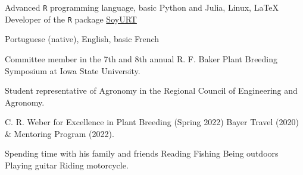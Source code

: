 \documentclass[]{mdkrause_cv_openfont}
\begin{document}
\begin{minipage}[t]{1\textwidth}
\sectionsep

Advanced \texttt{R} programming language, basic Python and Julia, Linux, \LaTeX \hspace{1 mm} \textbullet{} Developer of the \texttt{R} package \href{https://cran.r-project.org/web/packages/SoyURT/index.html}{SoyURT} \ExternalLink

\sectionsep

Portuguese (native), English, basic French

\sectionsep

\begin{tightemize}
	\item {} Committee member in the 7th and 8th annual R. F. Baker Plant Breeding Symposium at Iowa State University.
	\item {} Student representative of Agronomy in the Regional Council of Engineering and Agronomy.
\end{tightemize}

\sectionsep

C. R. Weber for Excellence in Plant Breeding (Spring 2022) \textbullet{} Bayer Travel (2020) \& Mentoring Program (2022). \\

\sectionsep

Spending time with his family and friends \textbullet{} Reading \textbullet{} Fishing \textbullet{} Being outdoors \textbullet{} Playing guitar \textbullet{} Riding motorcycle. \\

\sectionsep
{}

\sectionsep
\sectionsep



\end{minipage}
\end{document}
